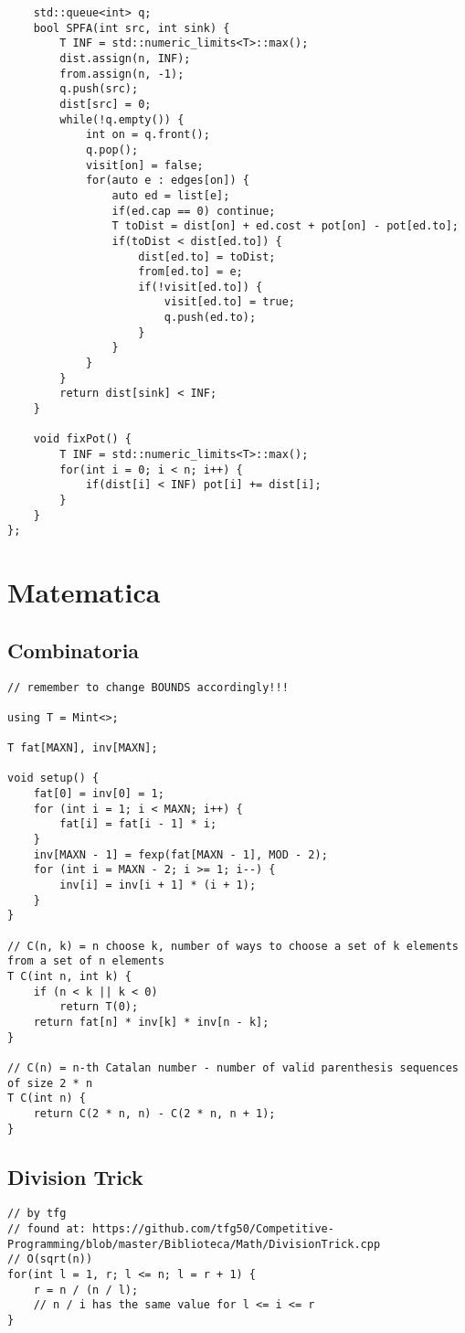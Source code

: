 \documentclass[12pt, a4paper, twoside]{article}
\begin{document}
\begin{lstlisting}
	std::queue<int> q;
	bool SPFA(int src, int sink) {
		T INF = std::numeric_limits<T>::max();
		dist.assign(n, INF);
		from.assign(n, -1);
		q.push(src);
		dist[src] = 0;
		while(!q.empty()) {
			int on = q.front();
			q.pop();
			visit[on] = false;
			for(auto e : edges[on]) {
				auto ed = list[e];
				if(ed.cap == 0) continue;
				T toDist = dist[on] + ed.cost + pot[on] - pot[ed.to];
				if(toDist < dist[ed.to]) {
					dist[ed.to] = toDist;
					from[ed.to] = e;
					if(!visit[ed.to]) {
						visit[ed.to] = true;
						q.push(ed.to);
					}
				}
			}
		}
		return dist[sink] < INF;
	}

	void fixPot() {
		T INF = std::numeric_limits<T>::max();
		for(int i = 0; i < n; i++) {
			if(dist[i] < INF) pot[i] += dist[i];
		}
	}
};
\end{lstlisting}



%
%

\section{Matematica}

\subsection{Combinatoria
}
\begin{lstlisting}
// remember to change BOUNDS accordingly!!!

using T = Mint<>;

T fat[MAXN], inv[MAXN];

void setup() {
	fat[0] = inv[0] = 1;
	for (int i = 1; i < MAXN; i++) {
		fat[i] = fat[i - 1] * i;
	}
	inv[MAXN - 1] = fexp(fat[MAXN - 1], MOD - 2);
	for (int i = MAXN - 2; i >= 1; i--) {
		inv[i] = inv[i + 1] * (i + 1);
	}
}

// C(n, k) = n choose k, number of ways to choose a set of k elements from a set of n elements
T C(int n, int k) {
	if (n < k || k < 0)
		return T(0);
	return fat[n] * inv[k] * inv[n - k];
}

// C(n) = n-th Catalan number - number of valid parenthesis sequences of size 2 * n
T C(int n) {
	return C(2 * n, n) - C(2 * n, n + 1);
}
\end{lstlisting}

\subsection{Division Trick
}
\begin{lstlisting}
// by tfg
// found at: https://github.com/tfg50/Competitive-Programming/blob/master/Biblioteca/Math/DivisionTrick.cpp
// O(sqrt(n))
for(int l = 1, r; l <= n; l = r + 1) {
	r = n / (n / l);
	// n / i has the same value for l <= i <= r
}
\end{lstlisting}
\end{document}
